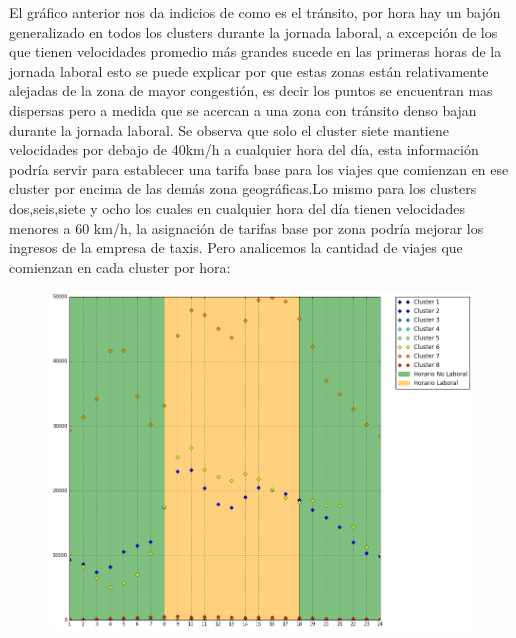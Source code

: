 \documentclass[a4paper]{article}
\begin{document}
\noindent
El gráfico anterior nos da indicios de como es el tránsito, por hora hay un bajón generalizado en todos los clusters durante la jornada laboral, a excepción de los que tienen velocidades promedio más grandes sucede en las primeras horas de la jornada laboral esto se puede explicar por que estas zonas están relativamente alejadas de la zona de mayor congestión, es decir los puntos se encuentran mas dispersas pero a medida que se acercan a una zona con tránsito denso bajan durante la jornada laboral. Se observa que solo el cluster siete mantiene velocidades por debajo de 40km/h a cualquier hora del día, esta información podría servir para establecer una tarifa base para los viajes que comienzan en ese cluster por encima de las demás zona geográficas.Lo mismo para los clusters dos,seis,siete y ocho los cuales en cualquier hora del día tienen velocidades menores a 60 km/h, la asignación de tarifas base por zona podría mejorar los ingresos de la empresa de taxis. Pero analicemos la cantidad de viajes que comienzan en cada cluster por hora:
\begin{center}
\begin{figure}[H]
\includegraphics[scale=.4]{descarga_22.png}
\end{figure}
\end{center}
 
\end{document}
